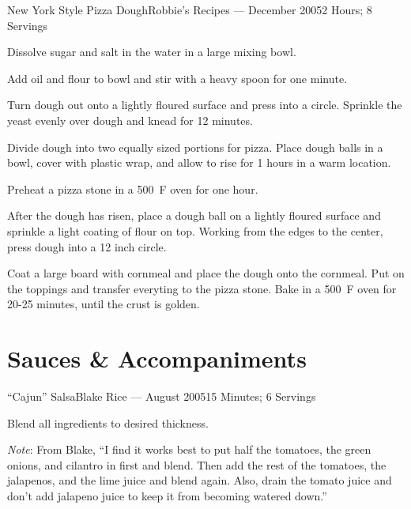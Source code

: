 \documentclass{article}
\begin{document}
\begin{recipe}{New York Style Pizza Dough}{Robbie's Recipes --- December 2005}{2  Hours; 8 Servings}

   Dissolve sugar and salt in the water in a large mixing bowl.

   Add oil and flour to bowl and stir with a heavy spoon for one minute.

   Turn dough out onto a lightly floured surface and press into a circle.
   Sprinkle the yeast evenly over dough and knead for 12 minutes.

   \newstep
   Divide dough into two equally sized portions for pizza.  Place dough balls in
   a bowl, cover with plastic wrap, and allow to rise for 1  hours in a
   warm location.

   \newstep
   Preheat a pizza stone in a 500\ \0F oven for one hour.

   \newstep
   After the dough has risen, place a dough ball on a lightly floured surface
   and sprinkle a light coating of flour on top.  Working from the edges to the
   center, press dough into a 12 inch circle.

   Coat a large board with cornmeal and place the dough onto the cornmeal.  Put
   on the toppings and transfer everyting to the pizza stone.  Bake in a 500\
   \0F oven for 20-25 minutes, until the crust is golden.

\end{recipe}

\section{Sauces \& Accompaniments}

\begin{recipe}{``Cajun'' Salsa}{Blake Rice --- August 2005}{15 Minutes; 6 Servings}

   Blend all ingredients to desired thickness.

   \freeform
   \emph{Note}: From Blake, ``I find it works best to put half the tomatoes, the
   green onions, and cilantro in first and blend. Then add the rest of the
   tomatoes, the jalapenos, and the lime juice and blend again. Also, drain the
   tomato juice and don't add jalapeno juice to keep it from becoming watered
   down.''

\end{recipe}
\end{document}
